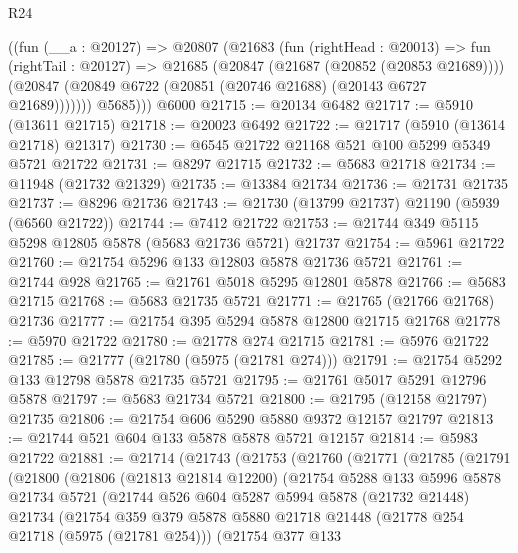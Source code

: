\begin{lexlean}{R24}
\begin{coremodule}
        ((fun (__a : @20127) =>
        @20807
          (@21683
            (fun (rightHead : @20013) =>
            fun (rightTail : @20127) =>
            @21685
              (@20847 (@21687 (@20852 (@20853 @21689))))
              (@20847 (@20849 @6722 (@20851 (@20746 @21688) (@20143 @6727 @21689)))))))
          @5685)))
    @6000
@21715 := @20134 @6482
@21717 := @5910 (@13611 @21715)
@21718 := @20023 @6492
@21722 := @21717 (@5910 (@13614 @21718) @21317)
@21730 := @6545 @21722 @21168 @521 @100 @5299 @5349 @5721 @21722
@21731 := @8297 @21715
@21732 := @5683 @21718
@21734 := @11948 (@21732 @21329)
@21735 := @13384 @21734
@21736 := @21731 @21735
@21737 := @8296 @21736
@21743 := @21730 (@13799 @21737) @21190 (@5939 (@6560 @21722))
@21744 := @7412 @21722
@21753 := @21744 @349 @5115 @5298 @12805 @5878 (@5683 @21736 @5721) @21737
@21754 := @5961 @21722
@21760 := @21754 @5296 @133 @12803 @5878 @21736 @5721
@21761 := @21744 @928
@21765 := @21761 @5018 @5295 @12801 @5878
@21766 := @5683 @21715
@21768 := @5683 @21735 @5721
@21771 := @21765 (@21766 @21768) @21736
@21777 := @21754 @395 @5294 @5878 @12800 @21715 @21768
@21778 := @5970 @21722
@21780 := @21778 @274 @21715
@21781 := @5976 @21722
@21785 := @21777 (@21780 (@5975 (@21781 @274)))
@21791 := @21754 @5292 @133 @12798 @5878 @21735 @5721
@21795 := @21761 @5017 @5291 @12796 @5878
@21797 := @5683 @21734 @5721
@21800 := @21795 (@12158 @21797) @21735
@21806 := @21754 @606 @5290 @5880 @9372 @12157 @21797
@21813 := @21744 @521 @604 @133 @5878 @5878 @5721 @12157
@21814 := @5983 @21722
@21881 := @21714
    (@21743
      (@21753
        (@21760
          (@21771
            (@21785
              (@21791
                (@21800
                  (@21806
                    (@21813 @21814 @12200)
                    (@21754
                      @5288
                      @133
                      @5996
                      @5878
                      @21734
                      @5721
                      (@21744
                        @526
                        @604
                        @5287
                        @5994
                        @5878
                        (@21732 @21448)
                        @21734
                        (@21754
                          @359
                          @379
                          @5878
                          @5880
                          @21718
                          @21448
                          (@21778 @254 @21718 (@5975 (@21781 @254)))
                          (@21754
                            @377
                            @133

\end{coremodule}
\end{lexlean}
